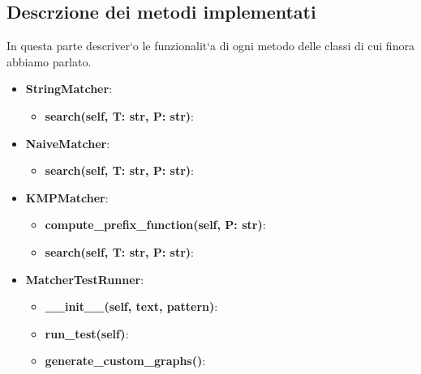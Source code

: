\documentclass{article}
\begin{document}
\subsection{Descrzione dei metodi implementati}
In questa parte descriver`o le funzionalit`a di ogni metodo delle classi di cui finora abbiamo parlato.
\begin{itemize}
    \item \textbf{StringMatcher}:
    \begin{itemize}
        \item \textbf{search(self, T: str, P: str)}:
    \end{itemize}
    \item \textbf{NaiveMatcher}:
    \begin{itemize}
        \item \textbf{search(self, T: str, P: str)}:
    \end{itemize}
    \item \textbf{KMPMatcher}:
    \begin{itemize}
        \item \textbf{compute\_prefix\_function(self, P: str)}:
        \item \textbf{search(self, T: str, P: str)}:
    \end{itemize}
    \item \textbf{MatcherTestRunner}:
    \begin{itemize}
        \item \textbf{\_\_init\_\_(self, text, pattern)}:
        \item \textbf{run\_test(self)}:
        \item \textbf{generate\_custom\_graphs()}:
    \end{itemize}
\end{itemize}
\end{document}
